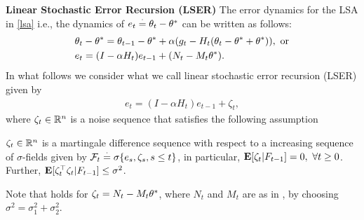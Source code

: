 \textbf{Linear Stochastic Error Recursion (LSER)} The error dynamics for the LSA in \eqref{lsa} i.e., the dynamics of $e_t\stackrel{\cdot}{=}\theta_t-\theta^*$ can be written as follows:
\begin{align}\label{errprelim}
&\theta_t-\theta^*=\theta_{t-1}-\theta^*+\alpha(g_t -H_t(\theta_t-\theta^*+\theta^*)),\text{~or}\nonumber\\
&e_t=(I-\alpha H_t)e_{t-1}+(N_t-M_t\theta^*).
\end{align}
In what follows we consider what we call linear stochastic error recursion (LSER) given by
\begin{align}\label{lsergen}
e_t=(I-\alpha H_t)e_{t-1}+\zeta_t,
\end{align}
where $\zeta_t\in \mathbb{R}^n$ is a noise sequence that satisfies the following assumption
\begin{assumption}\label{zetaassmp}
$\zeta_t\in \mathbb{R}^{n}$ is a martingale difference sequence with respect to a increasing sequence of $\sigma$-fields given by $\mathcal{F}_t\stackrel{\cdot}{=} \sigma \{e_s, \zeta_s,s\leq t\}$, in particular, $\mathbf{E}[\zeta_t|F_{t-1}]=0,~\forall t\geq 0$. Further, $\mathbf{E}[\zeta_t^\top \zeta_t|F_{t-1}]\leq \sigma^2$.
\end{assumption}
Note that  holds for $\zeta_t=N_t-M_t\theta^*$, where $N_t$ and $M_t$ are as in , by choosing $\sigma^2=\sigma_1^2+\sigma_2^2$.\par


